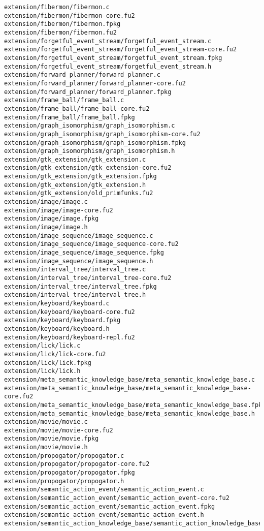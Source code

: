 \begin{lstlisting}
extension/fibermon/fibermon.c
extension/fibermon/fibermon-core.fu2
extension/fibermon/fibermon.fpkg
extension/fibermon/fibermon.fu2
extension/forgetful_event_stream/forgetful_event_stream.c
extension/forgetful_event_stream/forgetful_event_stream-core.fu2
extension/forgetful_event_stream/forgetful_event_stream.fpkg
extension/forgetful_event_stream/forgetful_event_stream.h
extension/forward_planner/forward_planner.c
extension/forward_planner/forward_planner-core.fu2
extension/forward_planner/forward_planner.fpkg
extension/frame_ball/frame_ball.c
extension/frame_ball/frame_ball-core.fu2
extension/frame_ball/frame_ball.fpkg
extension/graph_isomorphism/graph_isomorphism.c
extension/graph_isomorphism/graph_isomorphism-core.fu2
extension/graph_isomorphism/graph_isomorphism.fpkg
extension/graph_isomorphism/graph_isomorphism.h
extension/gtk_extension/gtk_extension.c
extension/gtk_extension/gtk_extension-core.fu2
extension/gtk_extension/gtk_extension.fpkg
extension/gtk_extension/gtk_extension.h
extension/gtk_extension/old_primfunks.fu2
extension/image/image.c
extension/image/image-core.fu2
extension/image/image.fpkg
extension/image/image.h
extension/image_sequence/image_sequence.c
extension/image_sequence/image_sequence-core.fu2
extension/image_sequence/image_sequence.fpkg
extension/image_sequence/image_sequence.h
extension/interval_tree/interval_tree.c
extension/interval_tree/interval_tree-core.fu2
extension/interval_tree/interval_tree.fpkg
extension/interval_tree/interval_tree.h
extension/keyboard/keyboard.c
extension/keyboard/keyboard-core.fu2
extension/keyboard/keyboard.fpkg
extension/keyboard/keyboard.h
extension/keyboard/keyboard-repl.fu2
extension/lick/lick.c
extension/lick/lick-core.fu2
extension/lick/lick.fpkg
extension/lick/lick.h
extension/meta_semantic_knowledge_base/meta_semantic_knowledge_base.c
extension/meta_semantic_knowledge_base/meta_semantic_knowledge_base-core.fu2
extension/meta_semantic_knowledge_base/meta_semantic_knowledge_base.fpkg
extension/meta_semantic_knowledge_base/meta_semantic_knowledge_base.h
extension/movie/movie.c
extension/movie/movie-core.fu2
extension/movie/movie.fpkg
extension/movie/movie.h
extension/propogator/propogator.c
extension/propogator/propogator-core.fu2
extension/propogator/propogator.fpkg
extension/propogator/propogator.h
extension/semantic_action_event/semantic_action_event.c
extension/semantic_action_event/semantic_action_event-core.fu2
extension/semantic_action_event/semantic_action_event.fpkg
extension/semantic_action_event/semantic_action_event.h
extension/semantic_action_knowledge_base/semantic_action_knowledge_base.c

\end{lstlisting}
